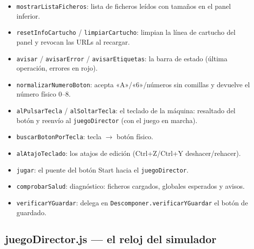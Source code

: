 \documentclass[../main.tex]{subfiles}
\begin{document}
\begin{itemize}
		máquina.
		\item \texttt{mostrarListaFicheros}: lista de ficheros leídos con
		tamaños en el panel inferior.
		\item \texttt{resetInfoCartucho} / \texttt{limpiarCartucho}: limpian
		la línea de cartucho del panel y revocan las URLs al recargar.
		\item \texttt{avisar} / \texttt{avisarError} / \texttt{avisarEtiquetas}:
		la barra de estado (última operación, errores en rojo).
		\item \texttt{normalizarNumeroBoton}: acepta «A»/«6»/números sin
		comillas y devuelve el número físico 0--8.
		\item \texttt{alPulsarTecla} / \texttt{alSoltarTecla}: el teclado de
		la máquina: resaltado del botón y reenvío al \texttt{juegoDirector}
		(con el juego en marcha).
		\item \texttt{buscarBotonPorTecla}: tecla $\rightarrow$ botón físico.
		\item \texttt{alAtajoTeclado}: los atajos de edición
		(Ctrl+Z/Ctrl+Y deshacer/rehacer).
		\item \texttt{jugar}: el puente del botón Start hacia el
		\texttt{juegoDirector}.
		\item \texttt{comprobarSalud}: diagnóstico: ficheros cargados,
		globales esperados y avisos.
		\item \texttt{verificarYGuardar}: delega en
		\texttt{Descomponer.verificarYGuardar} el botón de guardado.
	\end{itemize}
	
	\subsection*{juegoDirector.js — el reloj del simulador}
	
\end{document}
